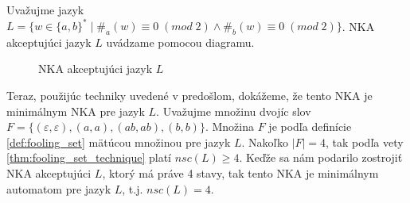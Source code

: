 \begin{example}
\normalfont Uvažujme jazyk $ L = \lbrace w \in \lbrace a,b \rbrace^* \; | \; \#_a(w) \equiv 0 \; (mod \; 2) \wedge \#_b(w) \equiv 0 \; (mod \; 2) \rbrace $. NKA akceptujúci jazyk $ L $ uvádzame pomocou diagramu.

\begin{figure}[H]
\centering
{}

\caption{NKA akceptujúci jazyk $ L $}
\end{figure}
Teraz, použijúc techniky uvedené v predošlom, dokážeme, že tento NKA je minimálnym NKA pre jazyk $ L $. Uvažujme množinu dvojíc slov $ F = \lbrace (\varepsilon, \varepsilon), (a,a), (ab,ab),(b,b) \rbrace $. Množina $ F $ je podľa definície \ref{def:fooling_set} mätúcou množinou pre jazyk $ L $. Nakoľko $ |F| = 4 $, tak podľa vety \ref{thm:fooling_set_technique} platí $ nsc(L) \geq 4 $. Keďže sa nám podarilo zostrojiť NKA akceptujúci $ L $, ktorý má práve 4 stavy, tak tento NKA je minimálnym automatom pre jazyk $ L $, t.j. $ nsc(L) = 4 $.
\end{example}

